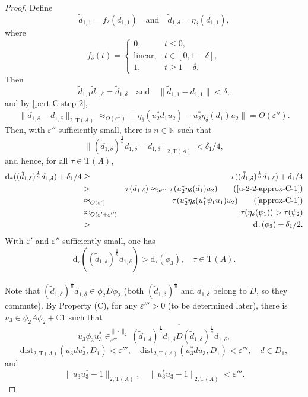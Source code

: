 \documentclass[12pt, oneside, psamsfonts]{amsart}
\theoremstyle{definition}
\theoremstyle{remark}
\numberwithin{equation}{section}
\newcommand{\norm}[1]{\| #1\|}
\newcommand{\Comp}{\mathbb C}
\newcommand{\eps}{\varepsilon}
\newcommand{\tr}{\mathrm{T}}
\begin{document}
\begin{proof}
Define
$$\tilde{d}_{1, 1} = f_{\delta}(d_{1, 1}) \quad \mathrm{and} \quad \tilde{d}_{1, \delta} = \eta_{\delta}(d_{1, 1}),$$
where
$$
f_{\delta}(t) = \left\{ 
\begin{array}{ll}
0, & t \leq 0, \\
\mathrm{linear}, & t\in [0, 1-\delta], \\
1, & t \geq 1-\delta.
\end{array}
\right.
$$ 
Then
\begin{equation}\label{pert-fur-hereditary}
 \tilde{d}_{1, 1} \tilde{d}_{1, \delta} = \tilde{d}_{1, \delta} \quad \mathrm{and} \quad \norm{\tilde{d}_{1, 1} - d_{1, 1}} < \delta,
 \end{equation}
and by \eqref{pert-C-step-2},
$$ \norm{\tilde{d}_{1, \delta} - d_{1, \delta}}_{2, \tr(A)} \approx_{O(\eps'')} \norm{\eta_\delta(u_2^* d_1 u_2) -  u^*_2\eta_\delta(d_1)u_2} = O(\eps'').$$
Then, with $\eps''$ sufficiently small, there is $n \in \mathbb N$ such that $$ \norm{(\tilde{d}_{1, \delta})^{\frac{1}{n}} d_{1, \delta} - d_{1, \delta}}_{2, \tr(A)} < \delta_1/4, $$
and hence, for all $\tau \in \tr(A)$,
\begin{eqnarray*}
\mathrm{d}_\tau((\tilde{d}_{1, \delta})^{\frac{1}{n}} d_{1, \delta}) + \delta_1/4 & \geq & \tau((\tilde{d}_{1, \delta})^{\frac{1}{n}} d_{1, \delta}) + \delta_1/4   \\
& > & \tau(d_{1, \delta}) \approx_{5\eps''} \tau(u_2^* \eta_{\delta}(d_1)u_2) \quad \quad (\eqref{u-2-2-approx-C-1}) \\
& \approx_{O(\eps')} &  \tau(u^*_2\eta_{\delta}(u_1^* \psi_1 u_1 )u_2) \quad\quad (\eqref{approx-C-1}) \\
& \approx_{O(\eps' + \eps'')} & \tau(\eta_{\delta}(\psi_1 ))  > \tau(\psi_2) \\ 
& > & \mathrm{d}_\tau(\phi_3) + \delta_1/2.
\end{eqnarray*}
With $\eps'$ and $\eps''$ sufficiently small, one has 
$$ \mathrm{d}_\tau((\tilde{d}_{1, \delta})^{\frac{1}{n}} d_{1, \delta}) > \mathrm{d}_\tau(\phi_3),\quad \tau \in \tr(A). $$
  

Note that $(\tilde{d}_{1, \delta})^{\frac{1}{n}} d_{1, \delta} \in \overline{\phi_2D\phi_2}$ (both $(\tilde{d}_{1, \delta})^{\frac{1}{n}}$ and  $d_{1, \delta}$ belong to $D$, so they commute). By Property (C), for any $\eps'''>0$ (to be determined later), there is $u_3 \in \overline{\phi_2 A \phi_2} + \Comp 1$ such that 
\begin{equation}\label{approx-C-3-h}
u_3\phi_3u_3^* \in _{\eps'''}^{\norm{\cdot}_2} \overline{(\tilde{d}_{1, \delta})^{\frac{1}{n}} d_{1, \delta} D (\tilde{d}_{1, \delta})^{\frac{1}{n}} d_{1, \delta}},
\end{equation}
$$\mathrm{dist}_{2, \tr(A)}(u_3 d u^*_3, D_1) < \eps''', \quad \mathrm{dist}_{2, \tr(A)}(u_3^*du_3, D_1) < \eps''',\quad d \in D_1, $$
and
\begin{equation}\label{approx-C-3-u}
\norm{u_3u_3^* - 1}_{2, \tr(A)},\quad  \norm{u_3^*u_3 - 1}_{2, \tr(A)} < \eps'''.
\end{equation}


\end{proof}
\end{document}

